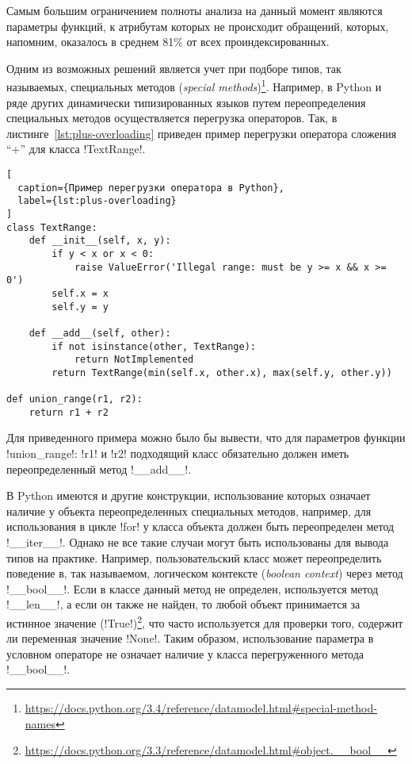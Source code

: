 Самым большим ограничением полноты анализа на данный момент являются параметры
функций, к атрибутам которых не происходит обращений, которых, напомним,
оказалось в среднем 81\% от всех проиндексированных.

Одним из возможных решений является учет при подборе типов, так называемых,
специальных методов (\emph{special
  methods})\footnote{\url{https://docs.python.org/3.4/reference/datamodel.html\#special-method-names}}. Например,
в Python и ряде других динамически типизированных языков путем переопределения
специальных методов осуществляется перегрузка операторов.  Так, в
листинге~\ref{lst:plus-overloading} приведен пример перегрузки оператора
сложения ``+'' для класса !TextRange!.

\begin{lstlisting}[
  caption={Пример перегрузки оператора в Python},
  label={lst:plus-overloading}
]
сlass TextRange:
    def __init__(self, x, y):
        if y < x or x < 0:
            raise ValueError('Illegal range: must be y >= x && x >= 0')
        self.x = x
        self.y = y

    def __add__(self, other):
        if not isinstance(other, TextRange):
            return NotImplemented
        return TextRange(min(self.x, other.x), max(self.y, other.y))

def union_range(r1, r2):
    return r1 + r2    

\end{lstlisting}

Для приведенного примера можно было бы вывести, что для параметров функции
!union_range!: !r1! и !r2! подходящий класс обязательно должен иметь
переопределенный метод !__add__!. 

В Python имеются и другие конструкции, использование которых означает
наличие у объекта переопределенных специальных методов, например, для
использования в цикле !for! у класса объекта должен быть переопределен метод
!__iter__!. Однако не все такие случаи могут быть использованы для вывода типов
на практике. Например, пользовательский класс может переопределить поведение в,
так называемом, логическом контексте (\emph{boolean context}) через метод
!__bool__!. Если в классе данный метод не определен, используется метод
!__len__!, а если он также не найден, то любой объект принимается за истинное
значение
(!True!)\footnote{\url{https://docs.python.org/3.3/reference/datamodel.html\#object.\_\_bool\_\_}},
что часто используется для проверки того, содержит ли переменная значение
!None!. Таким образом, использование параметра в условном операторе не означает
наличие у класса перегруженного метода !__bool__!.

